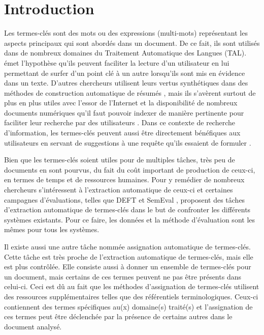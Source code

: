 \section{Introduction}
  Les termes-clés sont des mots ou des expressions (multi-mots) représentant les
  aspects principaux qui sont abordés dans un document. De ce fait, ils sont
  utilisés dans de nombreux domaines du Traitement Automatique des Langues
  (TAL). \citet{turney1999learningalgorithms} émet l'hypothèse qu'ils peuvent
  faciliter la lecture d'un utilisateur en lui permettant de surfer d'un point
  clé à un autre lorsqu'ils sont mis en évidence dans un texte. D'autres
  chercheurs utilisent leurs vertus synthétiques dans des méthodes de
  construction automatique de résumés \citep{wan2007iterativereinforcement,
  litvak2008graphbased, boudin2013multisentencecompression}, mais ils s'avèrent
  surtout de plus en plus utiles avec l'essor de l'Internet et la disponibilité
  de nombreux documents numériques qu'il faut pouvoir indexer de manière
  pertinente pour faciliter leur recherche par des utilisateurs
  \citep{medelyan2008smalltrainingset}. Dans ce contexte de recherche
  d'information, les termes-clés peuvent aussi être directement bénéfiques aux
  utilisateurs en servant de suggestions à une requête qu'ils essaient de
  formuler \citep{jones1999phrasier}.

  Bien que les termes-clés soient utiles pour de multiples tâches, très peu de
  documents en sont pourvus, du fait du coût important de production de ceux-ci,
  en termes de temps et de ressources humaines. Pour y remédier de nombreux
  chercheurs s'intéressent à l'extraction automatique de ceux-ci et certaines
  campagnes d'évaluations, telles que DEFT \citep{paroubek2012deft} et SemEval
  \citep{kim2010semeval}, proposent des tâches d'extraction automatique de
  termes-clés dans le but de confronter les différents systèmes existants. Pour
  ce faire, les données et la méthode d'évaluation sont les mêmes pour tous les
  systèmes.
  
  Il existe aussi une autre tâche nommée assignation automatique de termes-clés.
  Cette tâche est très proche de l'extraction automatique de termes-clés, mais
  elle est plus contrôlée. Elle consiste aussi à donner un ensemble de
  termes-clés pour un document, mais certains de ces termes peuvent ne pas être
  présents dans celui-ci. Ceci est dû au fait que les méthodes d'assignation de
  termes-clés utilisent des ressources supplémentaires telles que des
  référentiels terminologiques. Ceux-ci contiennent des termes spécifiques au(x)
  domaine(s) traité(s) et l'assignation de ces termes peut être déclenchée par
  la présence de certains autres dans le document analysé.

